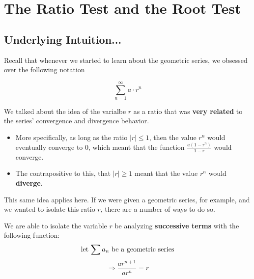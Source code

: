 \documentclass{report}
\begin{document}
\begin{sloppypar}
\begin{center}
{{    }
  }
\end{center}

\begin{center}
\end{center}



\section{The Ratio Test and the Root Test}
\subsection{Underlying Intuition...}
Recall that whenever we started to learn about the geometric series,
we obsessed over the following notation

\[ \sum_{n=1}^{\infty} a \cdot r^{n} \]

We talked about the idea of the varialbe $ r $ as a ratio that was \textbf{very related}
to the series' convergence and divergence behavior.
\begin{itemize}
  \item More specifically, as long as the ratio $ | r | \leq 1 $, then the value $ r^{n} $ would
        eventually converge to 0, which meant that the function $ \frac{a(1-r^{n})}{1-r} $ would
        converge.
  \item The contrapositive to this, that $ | r | \geq 1 $ meant that the value $ r^{n} $ would
        \textbf{diverge}.
\end{itemize}

This same idea applies here. If we were given a geometric series, for example, and we
wanted to isolate this ratio $ r $, there are a number of ways to do so.

We are able to isolate the variable $ r $ be analyzing \textbf{successive terms} with
the following function:
\[ \textrm{let $ \sum a_{n}$ be a geometric series} \]
\[ \Rightarrow \frac{ar^{n+1}}{ar^{n}} = r \]


\end{sloppypar}
\end{document}
